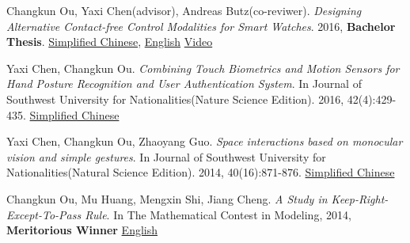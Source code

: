     \item{
        Changkun Ou, Yaxi Chen(advisor), Andreas Butz(co-reviwer).
        \emph{Designing Alternative Contact-free Control Modalities for Smart Watches}. 
        2016, \textbf{Bachelor Thesis}. \href{https://github.com/changkun/papers/blob/master/papers/ou2016bachelor-cn.pdf}{Simplified Chinese}, 
        \href{https://github.com/changkun/papers/blob/master/papers/ou2016bachelor-en.pdf}{English} \href{https://www.youtube.com/watch?v=C2-5z7pIv98}{Video}
    }
    \item{
        Yaxi Chen, Changkun Ou. 
        \emph{Combining Touch Biometrics and Motion Sensors for Hand Posture Recognition and User Authentication System}. 
        In Journal of Southwest University for Nationalities(Nature Science Edition). 
        2016, 42(4):429-435. \href{https://changkun.us/files/cv/touch.swun.html}{Simplified Chinese}
    }
    \item{
        Yaxi Chen, Changkun Ou, Zhaoyang Guo.
        \emph{Space interactions based on monocular vision and simple gestures}. 
        In Journal of Southwest University for Nationalities(Natural Science Edition). 
        2014, 40(16):871-876. \href{https://changkun.us/files/cv/vision.swun.html}{Simplified Chinese}
    }
    \item{
        Changkun Ou, Mu Huang, Mengxin Shi, Jiang Cheng. 
        \emph{A Study in Keep-Right-Except-To-Pass Rule}. 
        In The Mathematical Contest in Modeling, 2014, \textbf{Meritorious Winner} \href{hhttps://github.com/changkun/papers/blob/master/papers/ou2014car-paper.pdf}{English}
    }
 \resumeSubHeadingListEnd